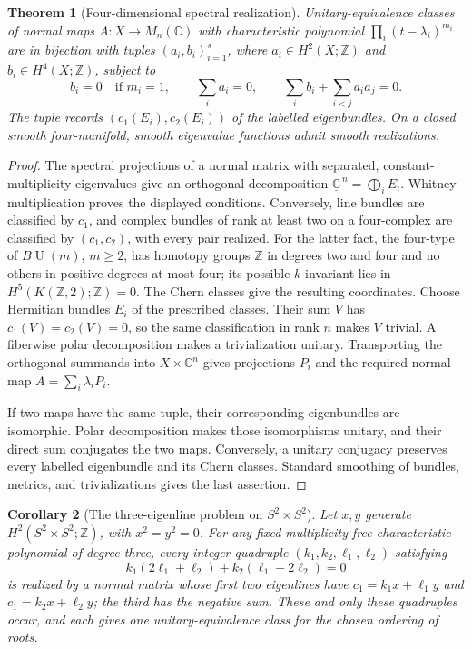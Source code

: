 \documentclass[11pt]{amsart}
\newcommand{\U}{\operatorname{U}}
\newcommand{\Z}{\mathbb Z}
\newcommand{\C}{\mathbb C}
\theoremstyle{plain}
\newtheorem{theorem}{Theorem}[section]
\newtheorem{corollary}[theorem]{Corollary}
\theoremstyle{definition}
\theoremstyle{remark}
\begin{document}
\begin{theorem}[Four-dimensional spectral realization]
\label{thm:four-dimensional-realization}
Unitary-equivalence classes of normal maps $A:X\to M_n(\C)$ with
characteristic polynomial
$\prod_i(t-\lambda_i)^{m_i}$ are in bijection with tuples
$(a_i,b_i)_{i=1}^s$, where
$a_i\in H^2(X;\Z)$ and $b_i\in H^4(X;\Z)$, subject to
\[
 b_i=0\quad\text{if }m_i=1,\qquad
 \sum_i a_i=0,\qquad
 \sum_i b_i+\sum_{i<j}a_i a_j=0.
\]
The tuple records $(c_1(E_i),c_2(E_i))$ of the labelled eigenbundles.
On a closed smooth four-manifold, smooth eigenvalue functions admit
smooth realizations.
\end{theorem}

\begin{proof}
The spectral projections of a normal matrix with separated,
constant-multiplicity eigenvalues give an orthogonal decomposition
$\underline{\C}^{\,n}=\bigoplus_i E_i$. Whitney multiplication proves
the displayed conditions. Conversely, line bundles are classified by
$c_1$, and complex bundles of rank at least two on a four-complex are
classified by $(c_1,c_2)$, with every pair realized. For the latter
fact, the four-type of $B\U(m)$, $m\geq2$, has homotopy groups $\Z$ in
degrees two and four and no others in positive degrees at most four;
its possible $k$-invariant lies in
$H^5(K(\Z,2);\Z)=0$. The Chern classes give the resulting
coordinates. Choose Hermitian bundles $E_i$ of the prescribed classes.
Their sum $V$ has $c_1(V)=c_2(V)=0$, so the same classification in rank
$n$ makes $V$ trivial. A fiberwise polar decomposition makes a
trivialization unitary. Transporting the orthogonal summands into
$X\times\C^n$ gives projections $P_i$ and the required normal map
$A=\sum_i\lambda_iP_i$.

If two maps have the same tuple, their corresponding eigenbundles are
isomorphic. Polar decomposition makes those isomorphisms unitary, and
their direct sum conjugates the two maps. Conversely, a unitary
conjugacy preserves every labelled eigenbundle and its Chern classes.
Standard smoothing of bundles, metrics, and trivializations gives the
last assertion.
\end{proof}

\begin{corollary}[The three-eigenline problem on $S^2\times S^2$]
\label{cor:friedman-park}
Let $x,y$ generate $H^2(S^2\times S^2;\Z)$, with $x^2=y^2=0$.
For any fixed multiplicity-free characteristic polynomial of degree
three, every integer quadruple $(k_1,k_2,\ell_1,\ell_2)$ satisfying
\[
 k_1(2\ell_1+\ell_2)+k_2(\ell_1+2\ell_2)=0
\]
is realized by a normal matrix whose first two eigenlines have
$c_1=k_1x+\ell_1y$ and $c_1=k_2x+\ell_2y$; the third has the negative
sum. These and only these quadruples occur, and each gives one
unitary-equivalence class for the chosen ordering of roots.
\end{corollary}
\end{document}
